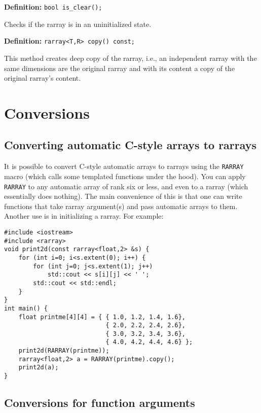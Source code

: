 \documentclass[11pt,twoside]{article}
\begin{document}
\noindent\textbf{Definition:} \texttt{bool is\_clear();}

Checks if the rarray is in an uninitialized state.

\noindent\textbf{Definition:} \texttt{rarray{\tt<}T,R{\tt>} copy() const;}

This method creates deep copy of the rarray, i.e., an independent rarray with the same dimensions are the original rarray and with its content a copy of the original rarray's content.


\section{Conversions}

\subsection{Converting automatic C-style arrays to rarrays}

It is possible to convert C-style automatic arrays to rarrays using the {\tt RARRAY} macro (which calls some templated functions under the hood).  You can apply {\tt RARRAY} to any automatic array of rank six or less, and even to a rarray (which essentially does nothing). 
The main convenience of this is that one can write functions that take rarray argument(s) and pass automatic arrays to them. Another use is in initializing a rarray. For example:
\vspace{-5pt}\begin{framed}\vspace{-14pt}%
\begin{verbatim}
#include <iostream>
#include <rarray>
void print2d(const rarray<float,2> &s) {
    for (int i=0; i<s.extent(0); i++) {
        for (int j=0; j<s.extent(1); j++)
            std::cout << s[i][j] << ' ';
        std::cout << std::endl;
    }
}
int main() {
    float printme[4][4] = { { 1.0, 1.2, 1.4, 1.6},
                            { 2.0, 2.2, 2.4, 2.6},
                            { 3.0, 3.2, 3.4, 3.6},
                            { 4.0, 4.2, 4.4, 4.6} };
    print2d(RARRAY(printme));
    rarray<float,2> a = RARRAY(printme).copy();
    print2d(a);
}
\end{verbatim}%
\vspace{-14pt}\end{framed}\vspace{-8pt}



\subsection{Conversions for function arguments}
\end{document}
